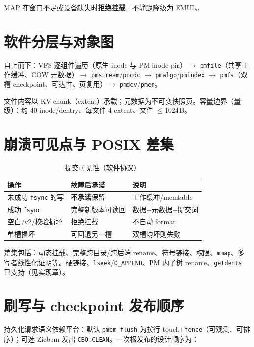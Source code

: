 MAP 在窗口不足或设备缺失时\textbf{拒绝挂载}，不静默降级为 EMUL。

\section{软件分层与对象图}

自上而下：VFS 逐组件遍历（原生 inode 与 PM inode pin）$\rightarrow$ \texttt{pmfile}（共享工作缓冲、COW 元数据）$\rightarrow$ \texttt{pmstream}/\texttt{pmcdc} $\rightarrow$ \texttt{pmalgo}/\texttt{pmindex} $\rightarrow$ \texttt{pmfs}（双槽 checkpoint、可达性、页复用）$\rightarrow$ \texttt{pmdev}/\texttt{pmem}。

文件内容以 KV chunk（extent）承载；元数据为不可变快照页。容量边界（量级）：约 40 inode/dentry、每文件 4 extent、文件 $\le$1024\,B。

\section{崩溃可见点与 POSIX 差集}
\label{sec:semantics}

\begin{table}[htbp]
  \centering
  \caption{提交可见性（软件协议）}
  \label{tab:visibility}
  \begin{tabular}{p{3.4cm}p{2.4cm}p{6.5cm}}
    \toprule
    操作 & 故障后承诺 & 说明 \\
    \midrule
    未成功 \texttt{fsync} 的写 & \textbf{不承诺}保留 & 工作缓冲/memtable \\
    成功 \texttt{fsync} & 完整新版本可读回 & 数据+元数据+提交词 \\
    空白/v2/校验损坏 & 拒绝挂载 & 不自动 format \\
    单槽损坏 & 可回退另一槽 & 双槽均坏则失败 \\
    \bottomrule
  \end{tabular}
\end{table}

差集包括：动态挂载、完整跨目录/跨后端 rename、符号链接、权限、\texttt{mmap}、多写者线性化证明等。硬链接、\texttt{lseek}/\texttt{O\_APPEND}、PM 内子树 rename、\texttt{getdents} 已支持（见实现章）。

\section{刷写与 checkpoint 发布顺序}

持久化请求语义依赖平台：默认 \texttt{pmem\_flush} 为按行 touch+\texttt{fence}（可观测、可排序）；可选 Zicbom 发出 \texttt{CBO.CLEAN}。一次根发布的设计顺序为：

